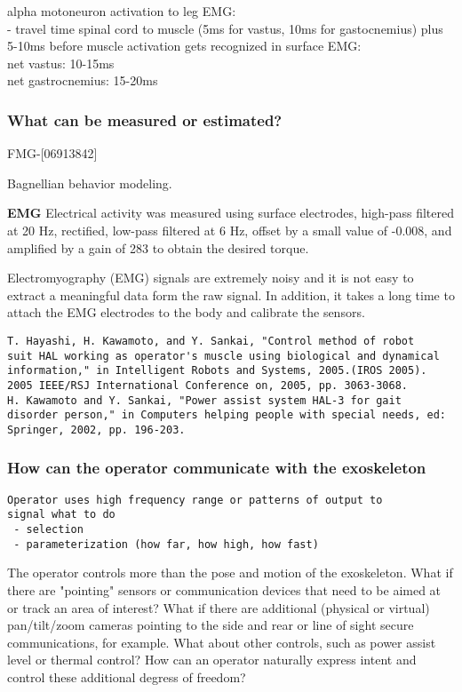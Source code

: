 \documentclass[letterpaper,12pt,fullpage]{article}
\begin{document}
alpha motoneuron activation to leg EMG:\\
- travel time spinal cord to muscle (5ms for vastus, 10ms for
gastocnemius) plus 5-10ms before muscle activation gets recognized in
surface EMG:\\
net vastus: 10-15ms\\
net gastrocnemius: 15-20ms

\subsubsection{What can be measured or estimated?}

FMG-[06913842]

Bagnellian behavior modeling.

{\bf EMG}
Electrical activity was measured using surface electrodes,
high-pass filtered at 20 Hz, rectified, low-pass filtered at 6 Hz,
offset by a small value of -0.008, and amplified by a gain of 283
to obtain the desired torque.~\cite{IEEE07139980}

Electromyography (EMG)
signals are extremely noisy and it is not easy to extract a
meaningful data form the raw signal. In addition, it takes a long
time to attach the EMG electrodes to the body and calibrate the
sensors.
\begin{verbatim}
T. Hayashi, H. Kawamoto, and Y. Sankai, "Control method of robot
suit HAL working as operator's muscle using biological and dynamical
information," in Intelligent Robots and Systems, 2005.(IROS 2005).
2005 IEEE/RSJ International Conference on, 2005, pp. 3063-3068.
H. Kawamoto and Y. Sankai, "Power assist system HAL-3 for gait
disorder person," in Computers helping people with special needs, ed:
Springer, 2002, pp. 196-203.
\end{verbatim}


\subsubsection{How can the operator communicate with the exoskeleton}

\begin{verbatim}
Operator uses high frequency range or patterns of output to
signal what to do
 - selection
 - parameterization (how far, how high, how fast)
\end{verbatim}

The operator controls more than the pose and motion of the
exoskeleton. What if there are "pointing" sensors or communication
devices that need to be aimed at or track an area of interest? What if
there are additional (physical or virtual) pan/tilt/zoom cameras
pointing to the side and rear or line of sight secure communications,
for example. What about other controls, such as power assist level or
thermal control? How can an operator naturally express intent and
control these additional degress of freedom?
\end{document}
